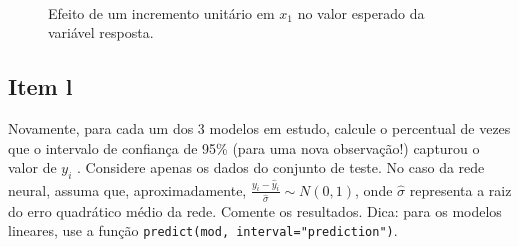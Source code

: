 \documentclass[
  a4paperpaper,
]{article}
\newenvironment{Shaded}{\begin{snugshade}}{\end{snugshade}}
\newcommand{\AttributeTok}[1]{\textcolor[rgb]{0.40,0.45,0.13}{#1}}
\newcommand{\DecValTok}[1]{\textcolor[rgb]{0.68,0.00,0.00}{#1}}
\newcommand{\FunctionTok}[1]{\textcolor[rgb]{0.28,0.35,0.67}{#1}}
\newcommand{\NormalTok}[1]{\textcolor[rgb]{0.00,0.23,0.31}{#1}}
\newcommand{\OtherTok}[1]{\textcolor[rgb]{0.00,0.23,0.31}{#1}}
\newcommand{\SpecialCharTok}[1]{\textcolor[rgb]{0.37,0.37,0.37}{#1}}
\begin{document}
~

\begin{Shaded}
\end{Shaded}

\begin{figure}[H]


\caption{\label{fig-efeitox1}Efeito de um incremento unitário em \(x_1\)
no valor esperado da variável resposta.}

\end{figure}%

\subsection{Item l}\label{item-l}

Novamente, para cada um dos 3 modelos em estudo, calcule o percentual de
vezes que o intervalo de confiança de 95\% (para uma nova observação!)
capturou o valor de \(y_i\) . Considere apenas os dados do conjunto de
teste. No caso da rede neural, assuma que, aproximadamente,
\(\frac{y_i - \hat{y}_i}{\hat{\sigma}} \sim N (0, 1)\), onde
\(\hat{\sigma}\) representa a raiz do erro quadrático médio da rede.
Comente os resultados. Dica: para os modelos lineares, use a função
\texttt{predict(mod,\ interval="prediction")}.
\end{document}

